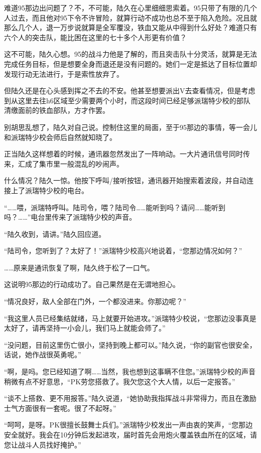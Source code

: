 难道95那边出问题了？不，不可能，陆久在心里细细思索着。95只带了有限的几个人过去，而且他对95下令不许冒险，就算行动不成功也总不至于陷入危险。况且就那么几个人，退一万步说就算是全军覆没，铁血又能从中得到什么好处？难道只有六个人的突击队，能比困在这里的七十多个人形更有价值？

这不可能，陆久心想。95的战斗力他是了解的，而且突击队十分灵活，就算是无法完成任务目标，但是想要全身而退还是没有问题的。她们一定是抵达了目标位置却发现行动无法进行，于是索性放弃了。

但陆久还是在心头感到挥之不去的不安。他甚至想要派出V去查看情况，但是考虑到从这里去往h6区域至少需要两个小时，而这段时间已经足够派瑞特少校的部队清缴面前的铁血部队，方才作罢。

别胡思乱想了，陆久对自己说。控制住这里的局面，至于95那边的事情，等一会儿和派瑞特少校会师后自然就知晓了。

正当陆久这样想着的时候，通讯器忽然发出了一阵响动。一大片通讯信号同时传来，汇成了集市里一般混乱的吵闹声。

什么情况？陆久一惊。他按下呼叫/接听按钮，通讯器开始搜索着波段，并自动连接上了派瑞特少校的电台。

“……喂，派瑞特呼叫。陆司令，喂？陆司令……能听到吗？请问……能听到吗？……”电台里传来了派瑞特少校的声音。

“陆久收到，请讲。”陆久回应道。

“陆司令，您听到了？太好了！”派瑞特少校高兴地说着，“您那边情况如何？”

……原来是通讯恢复了啊，陆久终于松了一口气。

这说明95那边的行动成功了。自己果然是在无谓地担心。

“情况良好，敌人全部在门外，一个都没进来。你那边呢？”

“我这里人员已经集结就绪，马上就要开始进攻。”派瑞特少校说，“您那边没事真是太好了，请再坚持一小会儿，我们马上就能会师了。”

“没问题，目前这里伤亡很小，坚持到晚上都可以。”陆久说，“你的副官也很安全，话说，她作战很英勇呢。”

“啊，是吗。您已经知道了啊……当然，我也想到这事瞒不住您。”派瑞特少校的声音稍微有点不好意思，“PK劳您搭救了。我欠您这个大人情，以后一定报答。”

“谈不上搭救、更不用报答。”陆久说道，“她协助我指挥战斗非常得力，而且在激励士气方面很有一套呢。很了不起呀。”

“呵呵，是呀。PK很擅长鼓舞士兵们。”派瑞特少校发出一声由衷的笑声，“您那边安全就好。我会在10分钟后发起进攻，届时首先会用炮火覆盖铁血所在的区域，请您让战斗人员找好掩护。”

